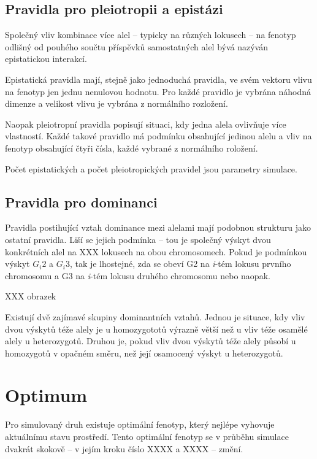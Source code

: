 \subsection{Pravidla pro pleiotropii a epistázi}

Společný vliv kombinace více alel -- typicky na různých lokusech -- na fenotyp odlišný od pouhého součtu příspěvků samostatných alel bývá nazýván epistatickou interakcí.

Epistatická pravidla mají, stejně jako jednoduchá pravidla, ve svém vektoru vlivu na fenotyp jen jednu nenulovou hodnotu. Pro každé pravidlo je vybrána náhodná dimenze a velikost vlivu je vybrána z normálního rozložení.

Naopak pleiotropní pravidla popisují situaci, kdy jedna alela ovlivňuje více vlastností. Každé takové pravidlo má podmínku obsahující jedinou alelu a vliv na fenotyp obsahující čtyři čísla, každé vybrané z normálního roložení.

Počet epistatických a počet pleiotropických pravidel jsou parametry simulace.

\subsection{Pravidla pro dominanci}

Pravidla postihující vztah dominance mezi alelami mají podobnou strukturu jako ostatní pravidla. Liší se jejich podmínka -- tou je společný výskyt dvou konkrétních alel na XXX lokusech na obou chromosomech. Pokud je podmínkou výskyt $G_i{2}$ a $G_i{3}$, tak je lhostejné, zda se obeví G2 na \textit{i}-tém lokusu prvního chromosomu a G3 na \textit{i}-tém lokusu druhého chromosomu nebo naopak.

XXX obrazek

Existují dvě zajímavé skupiny dominantních vztahů. Jednou je situace, kdy vliv dvou výskytů téže alely je u homozygototů výrazně větší než u vliv téže osamělé alely u heterozygotů. Druhou je, pokud vliv dvou výskytů téže alely působí u homozygotů v opačném směru, než její osamocený výskyt u heterozygotů.



\section{Optimum}

Pro simulovaný druh existuje optimální fenotyp, který nejlépe vyhovuje aktuálnímu stavu prostředí.
Tento optimální fenotyp se v průběhu simulace dvakrát skokově -- v jejím kroku číslo XXXX a XXXX -- změní.

